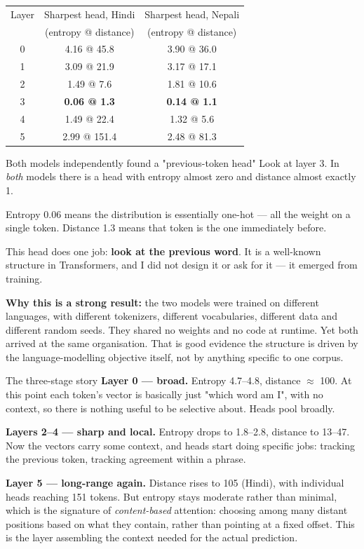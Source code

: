 \documentclass[11pt]{report}
\begin{document}
\begin{center}
\begin{tabular}{ccc}
\toprule
Layer & Sharpest head, Hindi & Sharpest head, Nepali \\
& (entropy @ distance) & (entropy @ distance) \\
\midrule
0 & 4.16 @ 45.8 & 3.90 @ 36.0 \\
1 & 3.09 @ 21.9 & 3.17 @ 17.1 \\
2 & 1.49 @ \phantom{0}7.6 & 1.81 @ 10.6 \\
3 & \textbf{0.06 @ \phantom{0}1.3} & \textbf{0.14 @ \phantom{0}1.1} \\
4 & 1.49 @ 22.4 & 1.32 @ \phantom{0}5.6 \\
5 & 2.99 @ 151.4 & 2.48 @ 81.3 \\
\bottomrule
\end{tabular}
\end{center}

\begin{concept}{Both models independently found a "previous-token head"}
Look at layer 3. In \emph{both} models there is a head with entropy almost zero
and distance almost exactly 1.

Entropy 0.06 means the distribution is essentially one-hot --- all the weight on
a single token. Distance 1.3 means that token is the one immediately before.

This head does one job: \textbf{look at the previous word}. It is a well-known
structure in Transformers, and I did not design it or ask for it --- it emerged
from training.

\textbf{Why this is a strong result:} the two models were trained on different
languages, with different tokenizers, different vocabularies, different data and
different random seeds. They shared no weights and no code at runtime. Yet both
arrived at the same organisation. That is good evidence the structure is driven
by the language-modelling objective itself, not by anything specific to one
corpus.
\end{concept}

\begin{concept}{The three-stage story}
\textbf{Layer 0 --- broad.} Entropy 4.7--4.8, distance $\approx$ 100. At this
point each token's vector is basically just "which word am I", with no context, so
there is nothing useful to be selective about. Heads pool broadly.

\textbf{Layers 2--4 --- sharp and local.} Entropy drops to 1.8--2.8, distance to
13--47. Now the vectors carry some context, and heads start doing specific jobs:
tracking the previous token, tracking agreement within a phrase.

\textbf{Layer 5 --- long-range again.} Distance rises to 105 (Hindi), with
individual heads reaching 151 tokens. But entropy stays moderate rather than
minimal, which is the signature of \emph{content-based} attention: choosing among
many distant positions based on what they contain, rather than pointing at a fixed
offset. This is the layer assembling the context needed for the actual prediction.
\end{concept}
\end{document}
